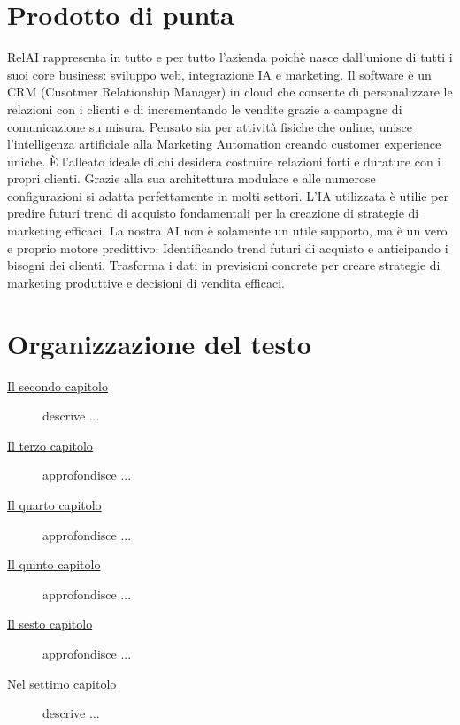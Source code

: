 \section{Prodotto di punta}
RelAI rappresenta in tutto e per tutto l'azienda poichè nasce dall'unione di tutti i suoi core business: sviluppo web, integrazione IA e marketing.
Il software è un CRM (Cusotmer Relationship Manager) in cloud che consente di personalizzare le relazioni con i clienti e di incrementando le vendite grazie a campagne di comunicazione su misura.
Pensato sia per attività fisiche che online, unisce l’intelligenza artificiale alla Marketing Automation creando customer experience uniche. È l'alleato ideale di chi desidera costruire relazioni forti e durature con i propri clienti. Grazie alla sua architettura modulare e alle numerose configurazioni si adatta perfettamente in molti settori. L'IA utilizzata è utilie per predire futuri trend di acquisto fondamentali per la creazione di strategie di marketing efficaci. 
La nostra AI non è solamente un utile supporto, ma è un vero e proprio motore predittivo. Identificando trend futuri di acquisto e anticipando i bisogni dei clienti. Trasforma i dati in previsioni concrete per creare strategie di marketing produttive e decisioni di vendita efficaci. 

\section{Organizzazione del testo}

\begin{description}
    \item[{\hyperref[cap:processi-metodologie]{Il secondo capitolo}}] descrive ...
    
    \item[{\hyperref[cap:descrizione-stage]{Il terzo capitolo}}] approfondisce ...
    
    \item[{\hyperref[cap:analisi-requisiti]{Il quarto capitolo}}] approfondisce ...
    
    \item[{\hyperref[cap:progettazione-codifica]{Il quinto capitolo}}] approfondisce ...
    
    \item[{\hyperref[cap:verifica-validazione]{Il sesto capitolo}}] approfondisce ...
    
    \item[{\hyperref[cap:conclusioni]{Nel settimo capitolo}}] descrive ...
\end{description}

